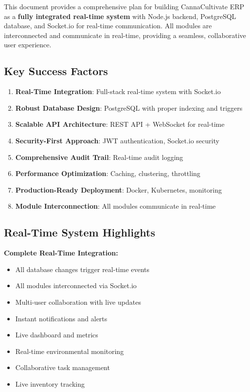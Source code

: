 \documentclass[11pt,a4paper]{article}
\begin{document}
\begin{highlightbox}
This document provides a comprehensive plan for building CannaCultivate ERP as a \textbf{fully integrated real-time system} with Node.js backend, PostgreSQL database, and Socket.io for real-time communication. All modules are interconnected and communicate in real-time, providing a seamless, collaborative user experience.
\end{highlightbox}

\subsection*{Key Success Factors}
\begin{enumerate}
    \item[\textcolor{accentgreen}{$\checkmark$}] \textbf{Real-Time Integration}: Full-stack real-time system with Socket.io
    \item[\textcolor{accentgreen}{$\checkmark$}] \textbf{Robust Database Design}: PostgreSQL with proper indexing and triggers
    \item[\textcolor{accentgreen}{$\checkmark$}] \textbf{Scalable API Architecture}: REST API + WebSocket for real-time
    \item[\textcolor{accentgreen}{$\checkmark$}] \textbf{Security-First Approach}: JWT authentication, Socket.io security
    \item[\textcolor{accentgreen}{$\checkmark$}] \textbf{Comprehensive Audit Trail}: Real-time audit logging
    \item[\textcolor{accentgreen}{$\checkmark$}] \textbf{Performance Optimization}: Caching, clustering, throttling
    \item[\textcolor{accentgreen}{$\checkmark$}] \textbf{Production-Ready Deployment}: Docker, Kubernetes, monitoring
    \item[\textcolor{accentgreen}{$\checkmark$}] \textbf{Module Interconnection}: All modules communicate in real-time
\end{enumerate}

\subsection*{Real-Time System Highlights}
\begin{realtimebox}
\textbf{Complete Real-Time Integration:}
\begin{itemize}
    \item All database changes trigger real-time events
    \item All modules interconnected via Socket.io
    \item Multi-user collaboration with live updates
    \item Instant notifications and alerts
    \item Live dashboard and metrics
    \item Real-time environmental monitoring
    \item Collaborative task management
    \item Live inventory tracking
\end{itemize}
\end{realtimebox}
\end{document}
